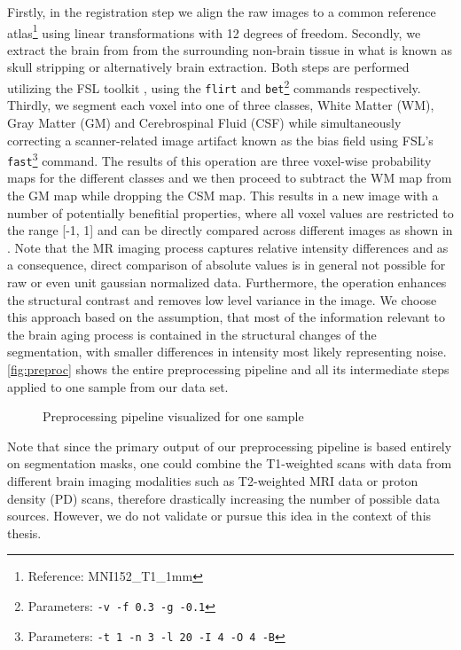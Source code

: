 Firstly, in the registration step we align the raw images to a common reference atlas\footnote{Reference: MNI152\_T1\_1mm} using linear transformations with 12 degrees of freedom. Secondly, we extract the brain from from the surrounding non-brain tissue in what is known as skull stripping or alternatively brain extraction. Both steps are performed utilizing the FSL toolkit \cite{jenkinson2012fsl}, using the \texttt{flirt} \cite{jenkinson2001global} \cite{jenkinson2002improved} and \texttt{bet}\footnote{Parameters: \texttt{-v -f 0.3 -g -0.1}} \cite{smith2002fast} \cite{jenkinson2005bet2} commands respectively. Thirdly, we segment each voxel into one of three classes, White Matter (WM), Gray Matter (GM) and Cerebrospinal Fluid (CSF) while simultaneously correcting a scanner-related image artifact known as the bias field using FSL's \texttt{fast}\footnote{Parameters: \texttt{-t 1 -n 3 -l 20 -I 4 -O 4 -B}} \cite{zhang2001segmentation} command. The results of this operation are three voxel-wise probability maps for the different classes and we then proceed to subtract the WM map from the GM map while dropping the CSM map. This results in a new image with a number of potentially benefitial properties, where all voxel values are restricted to the range [-1, 1] and can be directly compared across different images as shown in \cite{de2018clinically}. Note that the MR imaging process captures relative intensity differences and as a consequence, direct comparison of absolute values is in general not possible for raw or even unit gaussian normalized data. Furthermore, the operation enhances the structural contrast and removes low level variance in the image. We choose this approach based on the assumption, that most of the information relevant to the brain aging process is contained in the structural changes of the segmentation, with smaller differences in intensity most likely representing noise. \autoref{fig:preproc} shows the entire preprocessing pipeline and all its intermediate steps applied to one sample from our data set.


\begin{figure}
	\noindent\makebox[1.1\textwidth]{
		\centering
		
	}
	\caption{Preprocessing pipeline visualized for one sample}
	\label{fig:preproc}
\end{figure}

Note that since the primary output of our preprocessing pipeline is based entirely on segmentation masks, one could combine the T1-weighted scans with data from different brain imaging modalities such as T2-weighted MRI data or proton density (PD) scans, therefore drastically increasing the number of possible data sources. However, we do not validate or pursue this idea in the context of this thesis.

